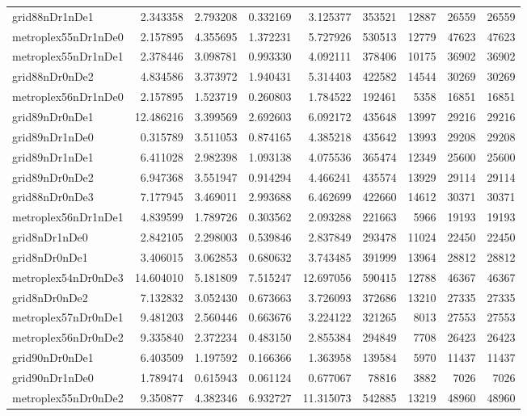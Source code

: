 \documentclass[../../../thesis.tex]{subfiles}
\begin{document}
\begin{longtable}{|l|r|r|r|r|r|r|r|r|}
grid88nDr1nDe1 & 2.343358 & 2.793208 & 0.332169 & 3.125377 & 353521 & 12887 & 26559 & 26559 \\
metroplex55nDr1nDe0 & 2.157895 & 4.355695 & 1.372231 & 5.727926 & 530513 & 12779 & 47623 & 47623 \\
metroplex55nDr1nDe1 & 2.378446 & 3.098781 & 0.993330 & 4.092111 & 378406 & 10175 & 36902 & 36902 \\
grid88nDr0nDe2 & 4.834586 & 3.373972 & 1.940431 & 5.314403 & 422582 & 14544 & 30269 & 30269 \\
metroplex56nDr1nDe0 & 2.157895 & 1.523719 & 0.260803 & 1.784522 & 192461 & 5358 & 16851 & 16851 \\
grid89nDr0nDe1 & 12.486216 & 3.399569 & 2.692603 & 6.092172 & 435648 & 13997 & 29216 & 29216 \\
grid89nDr1nDe0 & 0.315789 & 3.511053 & 0.874165 & 4.385218 & 435642 & 13993 & 29208 & 29208 \\
grid89nDr1nDe1 & 6.411028 & 2.982398 & 1.093138 & 4.075536 & 365474 & 12349 & 25600 & 25600 \\
grid89nDr0nDe2 & 6.947368 & 3.551947 & 0.914294 & 4.466241 & 435574 & 13929 & 29114 & 29114 \\
grid88nDr0nDe3 & 7.177945 & 3.469011 & 2.993688 & 6.462699 & 422660 & 14612 & 30371 & 30371 \\
metroplex56nDr1nDe1 & 4.839599 & 1.789726 & 0.303562 & 2.093288 & 221663 & 5966 & 19193 & 19193 \\
grid8nDr1nDe0 & 2.842105 & 2.298003 & 0.539846 & 2.837849 & 293478 & 11024 & 22450 & 22450 \\
grid8nDr0nDe1 & 3.406015 & 3.062853 & 0.680632 & 3.743485 & 391999 & 13964 & 28812 & 28812 \\
metroplex54nDr0nDe3 & 14.604010 & 5.181809 & 7.515247 & 12.697056 & 590415 & 12788 & 46367 & 46367 \\
grid8nDr0nDe2 & 7.132832 & 3.052430 & 0.673663 & 3.726093 & 372686 & 13210 & 27335 & 27335 \\
metroplex57nDr0nDe1 & 9.481203 & 2.560446 & 0.663676 & 3.224122 & 321265 & 8013 & 27553 & 27553 \\
metroplex56nDr0nDe2 & 9.335840 & 2.372234 & 0.483150 & 2.855384 & 294849 & 7708 & 26423 & 26423 \\
grid90nDr0nDe1 & 6.403509 & 1.197592 & 0.166366 & 1.363958 & 139584 & 5970 & 11437 & 11437 \\
grid90nDr1nDe0 & 1.789474 & 0.615943 & 0.061124 & 0.677067 & 78816 & 3882 & 7026 & 7026 \\
metroplex55nDr0nDe2 & 9.350877 & 4.382346 & 6.932727 & 11.315073 & 542885 & 13219 & 48960 & 48960 \\

\end{longtable}
\end{document}
